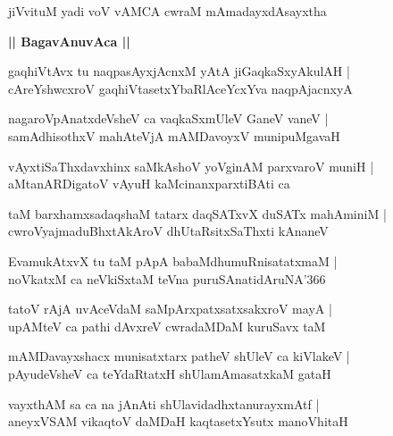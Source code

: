 \documentclass[twoside,12pt,openright]{book}
\newcounter{shloka}[chapter]
\def\uvaca#1{\centerline{{\large\textbf{#1}}}}
\begin{document}
\begin{shloka}%
jiVvituM yadi voV vAMCA cwraM mAmadayxdAsayxtha 
\end{shloka}

\uvaca{|| BagavAnuvAca ||}

\begin{shloka}%
gaqhiVtAvx tu naqpasAyxjAcnxM yAtA jiGaqkaSxyAkulAH |\\
cAreYshwcxroV gaqhiVtasetxYbaRlAceYcxYva naqpAjacnxyA 
\end{shloka}

\begin{shloka}%
nagaroVpAnatxdeVsheV ca vaqkaSxmUleV GaneV vaneV |\\
samAdhisothxV mahAteVjA mAMDavoyxV munipuMgavaH 
\end{shloka}

\begin{shloka}%
vAyxtiSaThxdavxhinx saMkAshoV yoVginAM parxvaroV muniH |\\
aMtanARDigatoV vAyuH kaMcinanxparxtiBAti ca 
\end{shloka}

\begin{shloka}%
taM barxhamxsadaqshaM tatarx daqSATxvX duSATx mahAminiM |\\
cwroVyajmaduBhxtAkAroV dhUtaRsitxSaThxti kAnaneV 
\end{shloka}

\begin{shloka}%
EvamukAtxvX tu taM pApA babaMdhumuRnisatatxmaM |\\
noVkatxM ca neVkiSxtaM teVna puruSAnatidAruNA\char'366
\end{shloka}

\begin{shloka}%
tatoV rAjA uvAceVdaM saMpArxpatxsatxsakxroV mayA |\\
upAMteV ca pathi dAvxreV cwradaMDaM kuruSavx taM 
\end{shloka}

\begin{shloka}%
mAMDavayxshacx munisatxtarx patheV shUleV ca kiVlakeV |\\
pAyudeVsheV ca teYdaRtatxH shUlamAmasatxkaM gataH 
\end{shloka}

\begin{shloka}%
vayxthAM sa ca na jAnAti shUlavidadhxtanurayxmAtf |\\
aneyxVSAM vikaqtoV daMDaH kaqtasetxYsutx manoVhitaH 
\end{shloka}
\end{document}
